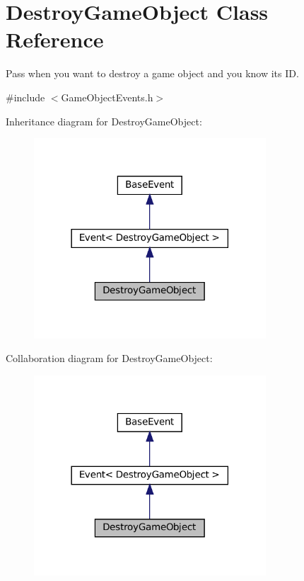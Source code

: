 \hypertarget{classDestroyGameObject}{}\section{Destroy\+Game\+Object Class Reference}
\label{classDestroyGameObject}


Pass when you want to destroy a game object and you know it\textquotesingle{}s ID.  




{\ttfamily \#include $<$Game\+Object\+Events.\+h$>$}



Inheritance diagram for Destroy\+Game\+Object\+:\nopagebreak
\begin{figure}[H]
\begin{center}
\leavevmode
\includegraphics[width=246pt]{classDestroyGameObject__inherit__graph}
\end{center}
\end{figure}


Collaboration diagram for Destroy\+Game\+Object\+:\nopagebreak
\begin{figure}[H]
\begin{center}
\leavevmode
\includegraphics[width=246pt]{classDestroyGameObject__coll__graph}
\end{center}
\end{figure}
